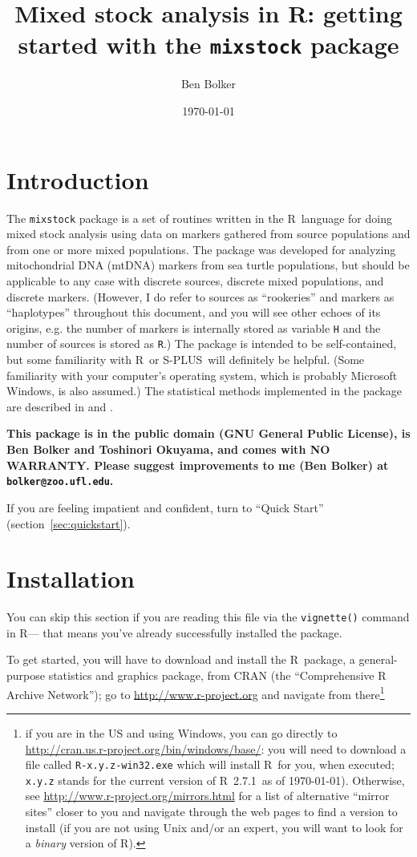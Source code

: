 \documentclass[11pt]{article}
\title{Mixed stock analysis in R: getting started with the {\tt mixstock}
package}
\author{Ben Bolker}
\date{\today}
\newcommand{\R}{{\sf R}}
\newcommand{\Splus}{{\sf S-PLUS}}
\newcommand{\code}[1]{{\tt #1}}
\newcommand{\Rver}{2.7.1}
\begin{document}
\maketitle

\linenumbers

\section{Introduction}
The {\tt mixstock} package is a set of routines
written in the \R\ language
\cite{Rmanual} for doing mixed stock
analysis using
data on markers gathered
from source populations and from one or more mixed populations.
The package was developed for
analyzing mitochondrial DNA (mtDNA) markers from
sea turtle populations, but should be applicable
to any case with discrete sources, discrete mixed
populations, and discrete markers.
(However, I do refer to sources as ``rookeries''
and markers as ``haplotypes'' throughout this document,
and you will see other echoes of its origins, e.g.
the number of markers is internally
stored as variable \code{H} and the number of sources is 
stored as \code{R}.)
The package is intended to be self-contained,
but some familiarity with \R\ or \Splus\ will
definitely be helpful.  (Some familiarity with your
computer's operating system, which is probably
Microsoft Windows, is also assumed.)
The statistical methods implemented in the
package are described in \cite{bolk+03c} and
\cite{PellMasu01}.

\textbf{This package is in the public domain (GNU General Public
License), is  Ben Bolker and
Toshinori Okuyama,
and comes with NO WARRANTY.  Please suggest improvements to
me (Ben Bolker) at {\tt bolker@zoo.ufl.edu}.}

If you are feeling impatient and confident, turn to
``Quick Start'' (section~\ref{sec:quickstart}).

\section{Installation}
You can skip this section if you are reading this
file via the \code{vignette()} command in \R --- that
means you've already successfully installed the
package.

To get started, you will have to download and
install the \R\ package, a general-purpose
statistics and graphics package, from
CRAN (the ``Comprehensive R Archive Network'');
go to \url{http://www.r-project.org} and navigate
from there\footnote{if you are in
the US and using Windows, you can go directly to
\url{http://cran.us.r-project.org/bin/windows/base/}:
you will need to download a file called {\tt R-x.y.z-win32.exe}
which will install \R\ for you, when executed; {\tt x.y.z}
stands for the current version of \R\ \Rver\ as of \today).
Otherwise, see
\url{http://www.r-project.org/mirrors.html} for a list of alternative
``mirror sites'' closer to you and navigate through the
web pages to find a version to install (if you are not
using Unix and/or an expert, you will want to look for
a \emph{binary} version of R).}
\end{document}
